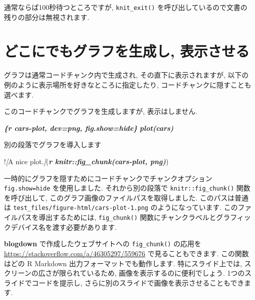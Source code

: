 \documentclass[
  11pt,
  lualatex,ja=standard,jafont=noto]{bxjsreport}
\newenvironment{Shaded}{\begin{snugshade}}{\end{snugshade}}
\newcommand{\CommentTok}[1]{\textcolor[rgb]{0.56,0.35,0.01}{\textit{#1}}}
\newcommand{\InformationTok}[1]{\textcolor[rgb]{0.56,0.35,0.01}{\textbf{\textit{#1}}}}
\newcommand{\NormalTok}[1]{#1}
\newcommand{\OtherTok}[1]{\textcolor[rgb]{0.56,0.35,0.01}{#1}}
\begin{document}
通常ならば100秒待つところですが, \texttt{knit\_exit()} を呼び出しているので文書の残りの部分は無視されます.

\hypertarget{fig-chunk}{%
\section{どこにでもグラフを生成し, 表示させる}\label{fig-chunk}}

グラフは通常コードチャンク内で生成され, その直下に表示されますが, 以下の例のように表示場所を好きなところに指定したり, コードチャンクに隠すことも選べます.

\begin{Shaded}
\begin{Highlighting}[]
\NormalTok{このコードチャンクでグラフを生成しますが, 表示はしません.}

\InformationTok{\textasciigrave{}\textasciigrave{}\textasciigrave{}\{r cars{-}plot, dev=\textquotesingle{}png\textquotesingle{}, fig.show=\textquotesingle{}hide\textquotesingle{}\}}
\InformationTok{plot(cars)}
\InformationTok{\textasciigrave{}\textasciigrave{}\textasciigrave{}}

\NormalTok{別の段落でグラフを導入します}

\NormalTok{!}\CommentTok{[}\OtherTok{A nice plot.}\CommentTok{]}\NormalTok{(}\InformationTok{\textasciigrave{}r knitr::fig\_chunk(\textquotesingle{}cars{-}plot\textquotesingle{}, \textquotesingle{}png\textquotesingle{})\textasciigrave{}}\NormalTok{)}
\end{Highlighting}
\end{Shaded}

一時的にグラフを隠すためにコードチャンクでチャンクオプション \texttt{fig.show=\textquotesingle{}hide\textquotesingle{}} を使用しました. それから別の段落で \texttt{knitr::fig\_chunk()} 関数を呼び出して, このグラフ画像のファイルパスを取得しました. このパスは普通は \texttt{test\_files/figure-html/cars-plot-1.png} のようになっています. このファイルパスを導出するためには, \texttt{fig\_chunk()} 関数にチャンクラベルとグラフィックデバイス名を渡す必要があります.

\textbf{blogdown} で作成したウェブサイトへの \texttt{fig\_chunk()} の応用を \url{https://stackoverflow.com/a/46305297/559676} で見ることもできます. この関数はどの R Markdown 出力フォーマットでも動作します. 特にスライド上では, スクリーンの広さが限られているため, 画像を表示するのに便利でしょう. 1つのスライドでコードを提示し, さらに別のスライドで画像を表示させることもできます.
\end{document}
